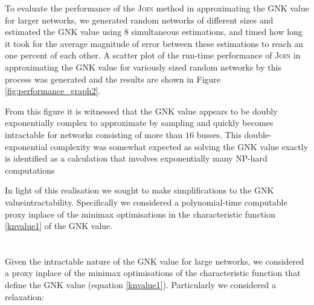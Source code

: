 To evaluate the performance of the \textsc{Join} method in approximating the GNK value for larger networks, we generated random networks of different sizes \DIFaddbegin {}\DIFaddend and estimated the GNK value using 8 simultaneous estimations, and timed how long it took for the average magnitude of error between these estimations to reach an one percent of each other.
A scatter plot of the run-time performance of \textsc{Join} in approximating the GNK value for variously sized random networks by this process was generated and the results are shown in Figure \ref{fig:performance_graph2}.


From this figure it is witnessed that the GNK value appears to be doubly exponentially complex to approximate by sampling and quickly becomes intractable for networks consisting of more than $16$ busses.
This double-exponential complexity was somewhat expected as solving the GNK value exactly is identified as a calculation that involves exponentially many \DIFaddbegin {}\DIFaddend NP-hard computations \DIFdelbegin {}%

\DIFdelend \DIFaddbegin {}\DIFaddend In light of this realisation we sought to make simplifications to the GNK value\DIFdelbegin {}\DIFdelend \DIFaddbegin {}\DIFaddend intractability.
Specifically we considered a polynomial-time computable proxy inplace of the minimax optimisations in the characteristic function \eqref{knvalue1} of the GNK value.

\iffigures

\fi

\iffigures

\fi

\DIFdelbegin \subsection{}%
\addtocounter{subsection}{-1}%
\DIFdelend \DIFaddbegin \pagebreak
\section{}\DIFaddend \label{sec:modified_gnk}

Given the intractable nature of the GNK value for large networks, we considered a proxy inplace of the minimax optimisations of the characteristic function that define the GNK value (equation \ref{knvalue1}).
Particularly we considered a relaxation:


